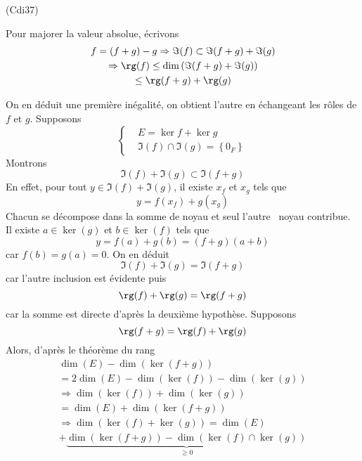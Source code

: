 \begin{tiny}(Cdi37)\end{tiny} Pour majorer la valeur absolue, écrivons
\begin{multline*}
  f = (f+g) - g 
  \Rightarrow \Im(f) \subset \Im(f+g) + \Im(g)\\
  \Rightarrow \rg(f) \leq \dim\left( \Im(f+g) + \Im(g)\right) \\
  \leq \rg(f+g) + \rg(g)
\end{multline*}

On en déduit une première inégalité, on obtient l'autre en échangeant les rôles de $f$ et $g$.\newline
Supposons
\begin{displaymath}
\left\lbrace 
\begin{aligned}
    &E = \ker f + \ker g \\ &\Im(f) \cap \Im(g) = \left\lbrace 0_F\right\rbrace 
  \end{aligned}
  \right.  
\end{displaymath}
Montrons
\begin{displaymath}
  \Im(f) + \Im(g) \subset \Im(f+g)
\end{displaymath}
En effet, pour tout $y \in \Im(f) + \Im(g)$, il existe $x_f$ et $x_g$ tels que
\begin{displaymath}
  y = f(x_f) + g(x_g)
\end{displaymath}
Chacun se décompose dans la somme de noyau et seul \og l'autre\fg~ noyau contribue. Il existe $a\in \ker(g)$ et $b\in \ker(f)$ tels que
\begin{displaymath}
  y = f(a) + g(b) = (f+g)(a+b)
\end{displaymath}
car $f(b)=g(a)=0$.\newline
On en déduit 
\begin{displaymath}
  \Im(f) + \Im(g) = \Im(f+g)
\end{displaymath}
car l'autre inclusion est évidente puis
\begin{displaymath}
  \rg(f) + \rg(g) = \rg(f+g)
\end{displaymath}
car la somme est directe d'après la deuxième hypothèse.\newline
Supposons 
\begin{displaymath}
  \rg(f+g) = \rg(f) + \rg(g)
\end{displaymath}
Alors, d'après le théorème du rang
\begin{multline*}
\dim(E) - \dim\left( \ker(f+g)\right)\\
= 2\dim(E)- \dim(\ker(f)) - \dim(\ker(g)) \\
\Rightarrow
\dim(\ker(f)) + \dim(\ker(g)) \\
= \dim(E) + \dim\left( \ker(f+g)\right) \\
\Rightarrow
\dim\left( \ker(f) + \ker(g)\right)
=\dim(E) \\
+ \underset{\geq 0}{\underbrace{\dim\left( \ker(f+g)\right) - \dim\left( \ker(f) \cap \ker(g)\right) }}
\end{multline*}

